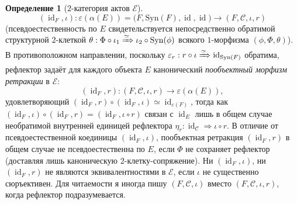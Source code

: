 \documentclass[11pt]{article}
\theoremstyle{plain}
\theoremstyle{definition}
\newtheorem{definition}[theorem]{Определение}
\newcommand{\cC}{\mathcal{C}}
\newcommand{\Syn}{\mathrm{Syn}}
\newcommand{\cE}{\mathcal{E}}
\DeclareMathOperator{\id}{id}
\begin{document}
\begin{definition}[$2$-категория актов $\cE$]
\[
  (\id_F, \iota) : \varepsilon(\alpha(E)) = \bigl(F, \Syn(F), \id, \id\bigr) \longrightarrow (F, \cC, \iota, r)
\]
(псевдоестественность по $E$ свидетельствуется непосредственно обратимой структурной $2$-клеткой $\theta : \Phi \circ \iota_1 \xRightarrow{\simeq} \iota_2 \circ \Syn(\phi)$ всякого $1$-морфизма $(\phi, \Phi, \theta)$). В противоположном направлении, поскольку $\varepsilon_r : r \circ \iota \xRightarrow{\simeq} \id_{\Syn(F)}$ обратима, рефлектор задаёт для каждого объекта $E$ канонический \emph{пообъектный морфизм ретракции} в $\cE$:
\[
  (\id_F, r) : (F, \cC, \iota, r) \longrightarrow \varepsilon(\alpha(E)),
\]
удовлетворяющий $(\id_F, r) \circ (\id_F, \iota) \simeq \id_{\varepsilon(F)}$, тогда как $(\id_F, \iota) \circ (\id_F, r) = (\id_F, \iota \circ r)$ связан с $\id_E$ лишь в общем случае необратимой внутренней единицей рефлектора $\eta_r : \id_\cC \Rightarrow \iota \circ r$. В отличие от псевдоестественной коединицы $(\id_F, \iota)$, пообъектная ретракция $(\id_F, r)$ в общем случае не псевдоестественна по $E$, если $\Phi$ не сохраняет рефлектор (доставляя лишь каноническую $2$-клетку-сопряжение). Ни $(\id_F, \iota)$, ни $(\id_F, r)$ не являются эквивалентностями в $\cE$, если $\iota$ не существенно сюръективен. Для читаемости я иногда пишу $(F, \cC, \iota)$ вместо $(F, \cC, \iota, r)$, когда рефлектор подразумевается.
\end{definition}
\end{document}
